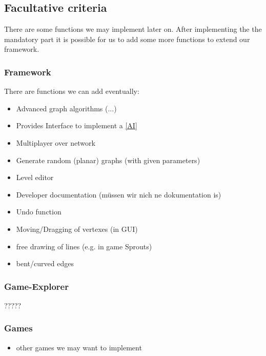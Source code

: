 \subsection{Facultative criteria}
\label{facultative-criteria}
There are some functions we may implement later on. After implementing the the mandatory part it is possible for us to add some more functions to extend our framework.

\subsubsection{Framework}
There are functions we can add eventually: 
\begin{itemize}
\item Advanced graph algorithms (...)
\item Provides Interface to implement a \ref{AI} 
\item Multiplayer over network
\item Generate random (planar) graphs (with given parameters)
\item Level editor
\item Developer documentation (müssen wir nich ne dokumentation is)
\item Undo function
\item Moving/Dragging of vertexes (in GUI)
\item free drawing of lines (e.g. in game Sprouts)
\item bent/curved edges
\end{itemize}


\subsubsection{Game-Explorer}
?????

\subsubsection{Games}
\begin{itemize}
\item other games we may want to implement
\end{itemize}